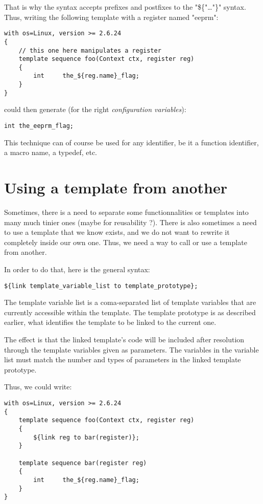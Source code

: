 \documentclass[american]{rtxreport}
\begin{document}
That is why the syntax accepts prefixes and postfixes to the "\$\{"\ldots"\}"
syntax. Thus, writing the following template with a register named "eeprm":
\begin{lstlisting}
with os=Linux, version >= 2.6.24
{
    // this one here manipulates a register
    template sequence foo(Context ctx, register reg)
    {
        int     the_${reg.name}_flag;
    }
}
\end{lstlisting}

could then generate (for the right \emph{configuration variables}):
\lstset{language=C}
\begin{lstlisting}
int the_eeprm_flag;
\end{lstlisting}

This technique can of course be used for any identifier, be it a function
identifier, a macro name, a typedef, etc.

\section{Using a template from another}

Sometimes, there is a need to separate some functionnalities or templates into
many much tinier ones (maybe for reusability ?). There is also sometimes a need
to use a template that we know exists, and we do not want to rewrite it
completely inside our own one. Thus, we need a way to call or use a template
from another.

In order to do that, here is the general syntax:
\begin{lstlisting}
${link template_variable_list to template_prototype};
\end{lstlisting}

The template variable list is a coma-separated list of template variables that
are currently accessible within the template. The template prototype is as
described earlier, what identifies the template to be linked to the current
one.

The effect is that the linked template's code will be included after resolution
through the template variables given as parameters. The variables in the
variable list must match the number and types of parameters in the linked
template prototype.

Thus, we could write: 
\begin{lstlisting}
with os=Linux, version >= 2.6.24
{
    template sequence foo(Context ctx, register reg)
    {
        ${link reg to bar(register)};
    }

    template sequence bar(register reg)
    {
        int     the_${reg.name}_flag;
    }
}
\end{lstlisting}
\end{document}
